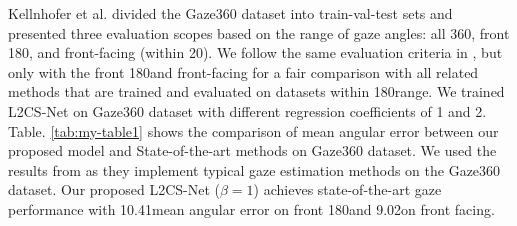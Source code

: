 \documentclass{article}
\begin{document}
\begin{table}[t]
\caption{Comparison of mean angular error between our proposed model and SOTA methods on Gaze360 dataset}
\label{tab:my-table1}
\end{table}



Kellnhofer et al. \cite{Gaze360} divided the Gaze360 dataset into train-val-test sets and presented three evaluation scopes based on the range of gaze angles: all 360\degree, front 180\degree, and front-facing (within 20\degree). We follow the same evaluation criteria in \cite{Gaze360}, but only with the front 180\degree and front-facing for a fair comparison with all related methods that are trained and evaluated on datasets within 180\degree range. We trained L2CS-Net on Gaze360 dataset with different regression coefficients of 1 and 2. Table. \ref{tab:my-table1} shows the comparison of mean angular error between our proposed model and State-of-the-art methods on Gaze360 dataset. We used the results from \cite{survey} as they implement typical gaze estimation methods on the Gaze360 dataset. Our proposed L2CS-Net ($\beta=1$) achieves state-of-the-art gaze performance with 10.41\degree mean angular error on front 180\degree and 9.02\degree on front facing. 
\end{document}
